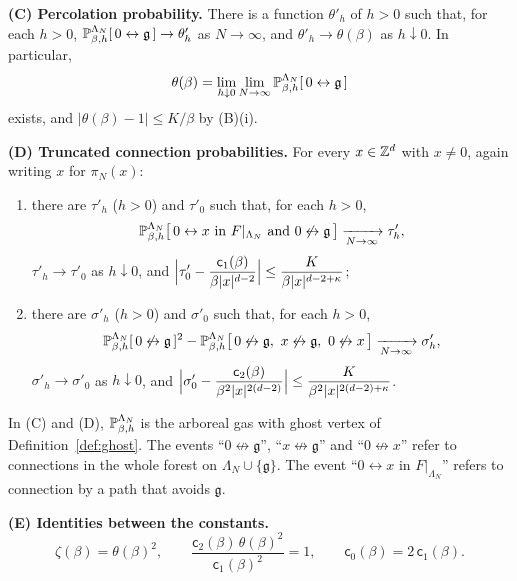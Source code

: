 \documentclass[11pt]{amsart}
\numberwithin{equation}{section}
\numberwithin{theorem}{section}
\newcommand{\conn}{\leftrightarrow}
\newcommand{\nconn}{\not\leftrightarrow}
\newcommand{\ghost}{\mathfrak{g}}
\begin{document}
\begin{theorem}
\smallskip\noindent\textbf{(C) Percolation probability.} There is a function
$\theta'_h$ of $h>0$ such that, for each $h>0$,
$\P^{\Lambda_N}_{\beta,h}[\,0\conn\ghost\,]\to\theta'_h$ as $N\to\infty$, and
$\theta'_h\to\theta(\beta)$ as $h\downarrow0$. In particular,
\begin{equation}\label{e:theta}
  \theta(\beta)=\lim_{h\downarrow0}\lim_{N\to\infty}\P^{\Lambda_N}_{\beta,h}[\,0\conn\ghost\,]
\end{equation}
exists, and $|\theta(\beta)-1|\le K/\beta$ by (B)(i).

\smallskip\noindent\textbf{(D) Truncated connection probabilities.} For every
$x\in\Z^d$ with $x\ne0$, again writing $x$ for $\pi_N(x)$:
\begin{enumerate}
\item there are $\tau'_h$ ($h>0$) and $\tau'_0$ such that, for each $h>0$,
  \[
    \P^{\Lambda_N}_{\beta,h}\bigl[\,0\conn x\text{ in }F|_{\Lambda_N}\ \text{and}\ 0\nconn\ghost\,\bigr]
    \xrightarrow[N\to\infty]{}\tau'_h ,
  \]
  $\tau'_h\to\tau'_0$ as $h\downarrow0$, and
  $\displaystyle\Bigl|\tau'_0-\frac{\mathsf c_1(\beta)}{\beta|x|^{d-2}}\Bigr|\le\frac{K}{\beta|x|^{d-2+\kappa}}$;
\item there are $\sigma'_h$ ($h>0$) and $\sigma'_0$ such that, for each $h>0$,
  \[
    \P^{\Lambda_N}_{\beta,h}[\,0\nconn\ghost\,]^2
    -\P^{\Lambda_N}_{\beta,h}\bigl[\,0\nconn\ghost,\ x\nconn\ghost,\ 0\nconn x\,\bigr]
    \xrightarrow[N\to\infty]{}\sigma'_h ,
  \]
  $\sigma'_h\to\sigma'_0$ as $h\downarrow0$, and
  $\displaystyle\Bigl|\sigma'_0-\frac{\mathsf c_2(\beta)}{\beta^2|x|^{2(d-2)}}\Bigr|\le\frac{K}{\beta^2|x|^{2(d-2)+\kappa}}$.
\end{enumerate}
In (C) and (D), $\P^{\Lambda_N}_{\beta,h}$ is the arboreal gas with ghost vertex of
Definition~\ref{def:ghost}. The events ``$0\nconn\ghost$'', ``$x\nconn\ghost$'' and ``$0\nconn x$''
refer to connections in the whole forest on $\Lambda_N\cup\{\ghost\}$. The event
``$0\conn x$ in $F|_{\Lambda_N}$'' refers to connection by a path that avoids $\ghost$.

\smallskip\noindent\textbf{(E) Identities between the constants.}
\begin{equation}\label{e:identities}
  \zeta(\beta)=\theta(\beta)^2,\qquad
  \frac{\mathsf c_2(\beta)\,\theta(\beta)^2}{\mathsf c_1(\beta)^2}=1,\qquad
  \mathsf c_0(\beta)=2\,\mathsf c_1(\beta).
\end{equation}
\end{theorem}
\end{document}

